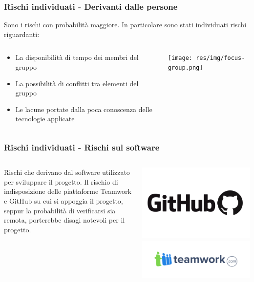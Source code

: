 \begin{frame}
    \frametitle{Rischi individuati - Derivanti dalle persone}

    Sono i rischi con probabilità maggiore. In particolare sono stati individuati rischi riguardanti:
    \begin{columns}
      \begin{column}{0.5\textwidth}
        \begin{itemize}
        \item La disponibilità di tempo dei membri del gruppo
        \item La possibilità di conflitti tra elementi del gruppo
        \item Le lacune portate dalla poca conoscenza delle tecnologie applicate
        \end{itemize}
      \end{column}
      \begin{column}{0.5\textwidth}
        \texttt{[image: res/img/focus-group.png]}
      \end{column}
    \end{columns}
\end{frame}

\begin{frame}
  \frametitle{Rischi individuati - Rischi sul software}
  \begin{columns}
    \begin{column}{0.5\textwidth}
  Rischi che derivano dal software utilizzato per sviluppare il progetto.
  Il rischio di indisposizione delle piattaforme Teamwork e GitHub su cui si appoggia il progetto, seppur la probabilità di verificarsi sia remota, porterebbe disagi notevoli per il progetto.
    \end{column}
    \begin{column}{0.5\textwidth}
      \includegraphics[width=0.6\columnwidth]{res/img/github.png}
      \includegraphics[width=0.6\columnwidth]{res/img/teamwork.png}
    \end{column}
  \end{columns}
\end{frame}


